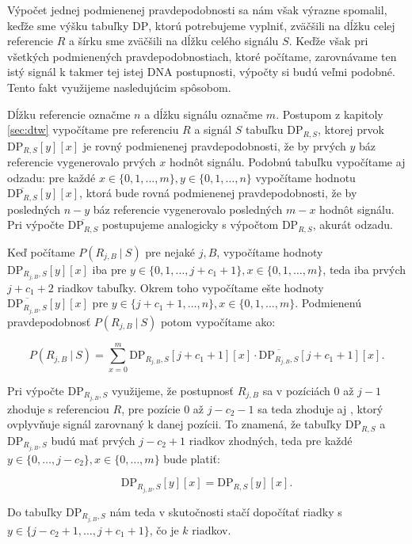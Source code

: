 Výpočet jednej podmienenej pravdepodobnosti sa nám však výrazne spomalil, keďže sme výšku tabuľky $\mathrm{DP}$, ktorú 
potrebujeme vyplniť, zväčšili na dĺžku celej referencie $R$ a šírku sme zväčšili na dĺžku celého signálu 
$S$. Keďže však pri všetkých podmienených pravdepodobnostiach, ktoré počítame, zarovnávame ten istý
signál k takmer tej istej DNA postupnosti, výpočty si budú veľmi podobné. Tento fakt využijeme nasledujúcim spôsobom.

Dĺžku referencie označme $n$ a dĺžku signálu označme $m$. Postupom z kapitoly \ref{sec:dtw} vypočítame
pre referenciu $R$ a signál $S$
tabuľku $\mathrm{DP}_{R,S}$, ktorej prvok $\mathrm{DP}_{R,S}[y][x]$ je rovný podmienenej pravdepodobnosti,
že by prvých $y$ báz referencie vygenerovalo prvých $x$ hodnôt signálu. Podobnú tabuľku vypočítame aj
odzadu: pre každé $x \in \{0, 1, \dots, m\}, y \in \{0, 1, \dots, n\}$ vypočítame hodnotu $\overline{\mathrm{DP}_{R,S}}[y][x]$,
ktorá bude rovná podmienenej pravdepodobnosti, že by posledných $n-y$ báz referencie vygenerovalo
posledných $m-x$ hodnôt signálu. Pri výpočte $\overline{\mathrm{DP}_{R,S}}$ postupujeme analogicky s 
výpočtom $\mathrm{DP}_{R,S}$, akurát odzadu.

Keď počítame $P(R_{j, B} ~|~ S)$ pre nejaké $j, B$, vypočítame hodnoty $\mathrm{DP}_{R_{j,B},S}[y][x]$ 
iba pre $y \in \{0, 1, \dots, j+c_1+1\}, x \in \{0, 1, \dots, m\}$, teda iba prvých $j+c_1+2$ riadkov 
tabuľky. Okrem toho vypočítame ešte hodnoty $\overline{\mathrm{DP}_{R_{j,B},S}}[y][x]$ pre $y \in \{j
+c_1+1, \dots, n\}, x \in \{0, 1, \dots, m\}$. Podmienenú pravdepodobnosť $P(R_{j, B} ~|~ S)$ potom 
vypočítame ako:

$$P(R_{j,B} ~|~ S) = \sum\limits_{x = 0}^m \mathrm{DP}_{R_{j,B},S}[j+c_1+1][x] \cdot \overline{\mathrm{DP}_{R_{j,B},S}}[j+c_1+1][x]\text{.}$$ 

Pri výpočte $\mathrm{DP}_{R_{j,B},S}$ využijeme, že postupnosť $R_{j,B}$ sa v pozíciách $0$ až $j-1$
zhoduje s referenciou $R$, pre pozície $0$ až $j-c_2-1$ sa teda zhoduje aj \kmer{}, ktorý ovplyvňuje
signál zarovnaný k danej pozícii. To znamená, že tabuľky $\mathrm{DP}_{R,S}$ a 
$\mathrm{DP}_{R_{j,B},S}$ budú mať prvých $j-c_2+1$ riadkov zhodných, teda pre každé $y \in \{0, \dots, j-c_2\}, x \in \{0, \dots, m\}$ bude platiť:

$$\mathrm{DP}_{R_{j,B},S}[y][x] = \mathrm{DP}_{R,S}[y][x]\text{.}$$

Do tabuľky $\mathrm{DP}_{R_{j,B},S}$ nám teda v skutočnosti stačí dopočítať riadky s $y \in \{j-c_2+1, \dots, j+c_1+1\}$, čo je $k$ riadkov.

